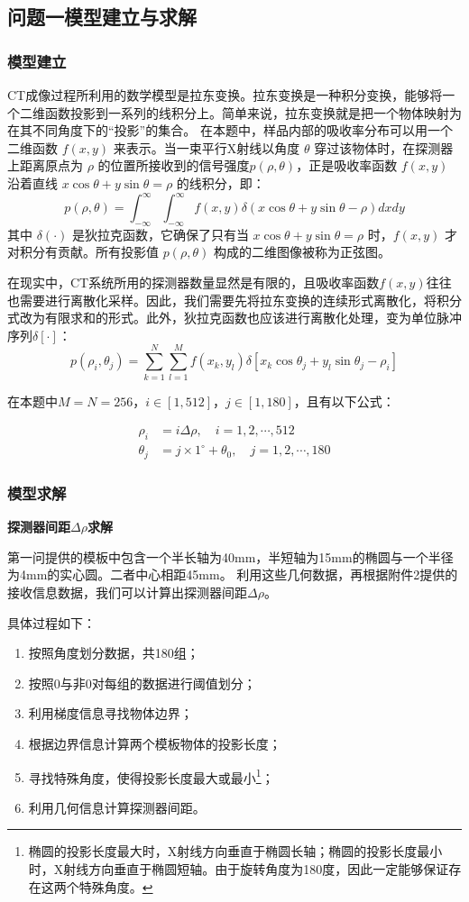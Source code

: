 \subsection{问题一模型建立与求解}
\subsubsection{模型建立}
CT成像过程所利用的数学模型是拉东变换。拉东变换是一种积分变换，能够将一个二维函数投影到一系列的线积分上。简单来说，拉东变换就是把一个物体映射为在其不同角度下的“投影”的集合。
在本题中，样品内部的吸收率分布可以用一个二维函数 $f(x,y)$ 来表示。当一束平行X射线以角度 $\theta$ 穿过该物体时，在探测器上距离原点为 $\rho$ 的位置所接收到的信号强度$p(\rho,\theta)$，正是吸收率函数 $f(x,y)$ 沿着直线 $x\cos\theta+y\sin\theta=\rho$ 的线积分，即：
$$p(\rho,\theta)=\int_{-\infty}^{\infty}\int_{-\infty}^{\infty}f(x,y)\delta(x\cos\theta+y\sin\theta-\rho)dxdy$$
其中 $\delta(\cdot)$ 是狄拉克函数，它确保了只有当 $x\cos\theta+y\sin\theta=\rho$ 时，$f(x,y)$ 才对积分有贡献。所有投影值 $p(\rho,\theta)$ 构成的二维图像被称为正弦图。

在现实中，CT系统所用的探测器数量显然是有限的，且吸收率函数$f(x,y)$往往也需要进行离散化采样。因此，我们需要先将拉东变换的连续形式离散化，将积分式改为有限求和的形式。此外，狄拉克函数也应该进行离散化处理，变为单位脉冲序列$\delta[\cdot]$：
$$p(\rho_i,\theta_j)=\sum_{k=1}^{N}\sum_{l=1}^{M}f(x_k,y_l)\delta[x_k\cos\theta_j+y_l\sin\theta_j-\rho_i]$$

在本题中$M=N=256$，$i \in [1,512]$，$j \in [1,180]$，且有以下公式：

\begin{equation*}
    \begin{aligned}
        \rho_i &= i\Delta\rho, \quad i=1,2,\cdots,512 \\
        \theta_j &= j\times 1^\circ+\theta_0, \quad j=1,2,\cdots,180
    \end{aligned}
\end{equation*}

\subsubsection{模型求解}
\textbf{探测器间距$\Delta\rho$求解}
\par
第一问提供的模板中包含一个半长轴为40mm，半短轴为15mm的椭圆与一个半径为4mm的实心圆。二者中心相距45mm。
利用这些几何数据，再根据附件2提供的接收信息数据，我们可以计算出探测器间距$\Delta\rho$。\par
具体过程如下：
\begin{enumerate}
    \item 按照角度划分数据，共180组；
    \item 按照0与非0对每组的数据进行阈值划分；
    \item 利用梯度信息寻找物体边界；
    \item 根据边界信息计算两个模板物体的投影长度；
    \item 寻找特殊角度，使得投影长度最大或最小\footnote{椭圆的投影长度最大时，X射线方向垂直于椭圆长轴；椭圆的投影长度最小时，X射线方向垂直于椭圆短轴。由于旋转角度为180度，因此一定能够保证存在这两个特殊角度。}；
    \item 利用几何信息计算探测器间距。
\end{enumerate}

